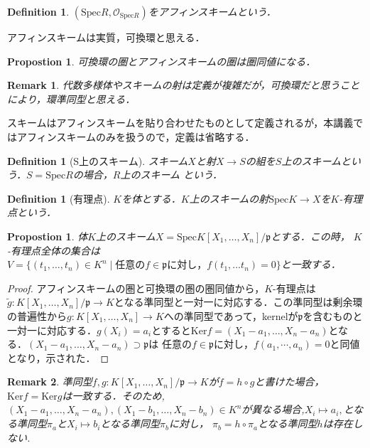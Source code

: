 \documentclass{ujarticle}
\newtheorem{dfn}[thm]{Definition}
\newtheorem{prop}[thm]{Propostion}
\newtheorem*{rem}{Remark}
\begin{document}
\begin{dfn}
 $(\mathrm{Spec}R,\mathcal{O}_{\mathrm{Spec}R})$をアフィンスキームという．
\end{dfn}

アフィンスキームは実質，可換環と思える．

\begin{prop}
 可換環の圏とアフィンスキームの圏は圏同値になる．
\end{prop}
\begin{rem}
 代数多様体やスキームの射は定義が複雑だが，可換環だと思うことにより，環準同型と思える．
\end{rem}
スキームはアフィンスキームを貼り合わせたものとして定義されるが，本講義ではアフィンスキームのみを扱うので，定義は省略する．

\begin{dfn}[S上のスキーム]
  スキーム$X$と射$X \to S$の組を$S$上のスキームという．$S=\mathrm{Spec}R$の場合，$R$上のスキーム
  という．
\end{dfn}

\begin{dfn}[有理点]
  $K$を体とする．$K$上のスキームの射$\mathrm{Spec}K \to X$を$K$-有理点という．
\end{dfn}
\begin{prop}
 体$K$上のスキーム$X=\mathrm{Spec}K[X_1,\dots,X_n]/\mathfrak{p}$とする．この時，
 $K$-有理点全体の集合は$V=\{(t_1,\dots,t_n) \in K^n \mid \mbox{任意の}f \in \mathfrak{p} \mbox{に対し，}f(t_1, \dots t_n)=0  \} $と一致する．
\end{prop}
\begin{proof}
アフィンスキームの圏と可換環の圏の圏同値から，$K$-有理点は$\tilde{g}:K[X_1,\dots,X_n]/\mathfrak{p} \to K$となる準同型と一対一に対応する．この準同型は剰余環の普遍性から$g:K[X_1,\dots,X_n] \to K$への準同型であって，kernelが$\mathfrak{p}$を含むものと一対一に対応する．$g(X_i)=a_i$とすると$\mathrm{Ker}f=(X_1 -a_1, \dots,X_n -a_n)$となる．$(X_1 -a_1, \dots,X_n -a_n) \supset \mathfrak{p}$は
任意の$f \in  \mathfrak{p}$に対し，$f(a_1,\cdots,a_n)=0$と同値となり，示された．
\end{proof}
\begin{rem}
 準同型$f,g: K[X_1,\dots,X_n]/\mathfrak{p} \to K$が$f=h \circ g$と書けた場合，$\mathrm{Ker}f = \mathrm{Ker}g$は一致する．そのため,$(X_1 - a_1,\dots,X_n - a_n),(X_1 - b_1,\dots,X_n - b_n) \in K^n$が異なる場合,$X_i \mapsto a_i,$となる準同型$\pi_a$と$X_i \mapsto b_i$となる準同型$\pi_b$に対し，
 $\pi_b = h \circ \pi_a$となる準同型$h$は存在しない.
\end{rem}
\end{document}
